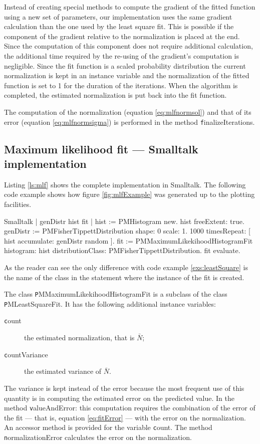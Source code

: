 Instead of creating special methods to compute the gradient of the
fitted function using a new set of parameters, our implementation
uses the same gradient calculation than the one used by the least
square fit. This is possible if the component of the gradient
relative to the normalization is placed at the end. Since the
computation of this component does not require additional
calculation, the additional time required by the re-using of the
gradient's computation is negligible. Since the fit function is a
scaled probability distribution the current normalization is kept
in an instance variable and the normalization of the fitted
function is set to 1 for the duration of the iterations. When the
algorithm is completed, the estimated normalization is put back
into the fit function.

The computation of the normalization (equation
\ref{eq:mlfnormsol}) and that of its error (equation
\ref{eq:mlfnormsigma}) is performed in the method {\texttt
finalizeIterations}.

\subsection{Maximum likelihood fit --- Smalltalk  implementation}
\label{sec:smlfhist}Listing \ref{ls:mlf} shows the complete
implementation in Smalltalk. The following code example shows how
figure \ref{fig:mlfExample} was generated up to the plotting
facilities.
\begin{displaycode}{Smalltalk}
 | genDistr hist fit |
 hist := PMHistogram new.
 hist freeExtent: true.
 genDistr := PMFisherTippettDistribution shape: 0 scale: 1.
 1000 timesRepeat: [ hist accumulate: genDistr random ].
 fit := PMMaximumLikekihoodHistogramFit histogram: hist
            distributionClass: PMFisherTippettDistribution.
 fit evaluate.
\end{displaycode}
As the reader can see the only difference with code example
\ref{exs:leastSquare} is the name of the class in the statement
where the instance of the fit is created.

\noindent The class {\texttt PMMaximumLikekihoodHistogramFit} is a
subclass of the class {\texttt PMLeastSquareFit}. It has the
following additional instance variables:
\begin{description}
  \item[\texttt count] the estimated normalization, that is $\bar{N}$;
  \item[\texttt countVariance] the estimated variance of $\bar{N}$.
\end{description}
The variance is kept instead of the error because the most
frequent use of this quantity is in computing the estimated error
on the predicted value. In the method {\texttt valueAndError:} this
computation requires the combination of the error of the fit ---
that is, equation \ref{eq:fitError} --- with the error on the
normalization. An accessor method is provided for the variable
{\texttt count}. The method {\texttt normalizationError} calculates the
error on the normalization.

